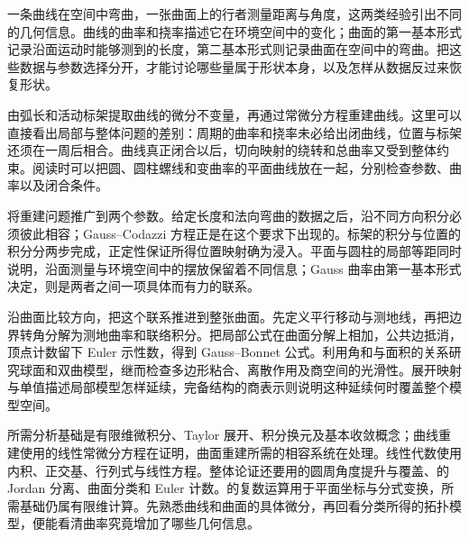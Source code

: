 
% 

\BookPartGuide

一条曲线在空间中弯曲，一张曲面上的行者测量距离与角度，这两类经验引出不同的几何信息。曲线的曲率和挠率描述它在环境空间中的变化；曲面的第一基本形式记录沿面运动时能够测到的长度，第二基本形式则记录曲面在空间中的弯曲。把这些数据与参数选择分开，才能讨论哪些量属于形状本身，以及怎样从数据反过来恢复形状。

\ProseParagraphBreak

由弧长和活动标架提取曲线的微分不变量，再通过常微分方程重建曲线。这里可以直接看出局部与整体问题的差别：周期的曲率和挠率未必给出闭曲线，位置与标架还须在一周后相合。曲线真正闭合以后，切向映射的绕转和总曲率又受到整体约束。阅读时可以把圆、圆柱螺线和变曲率的平面曲线放在一起，分别检查参数、曲率以及闭合条件。

\ProseParagraphBreak

将重建问题推广到两个参数。给定长度和法向弯曲的数据之后，沿不同方向积分必须彼此相容；Gauss--Codazzi 方程正是在这个要求下出现的。标架的积分与位置的积分分两步完成，正定性保证所得位置映射确为浸入。平面与圆柱的局部等距同时说明，沿面测量与环境空间中的摆放保留着不同信息；Gauss 曲率由第一基本形式决定，则是两者之间一项具体而有力的联系。

\ProseParagraphBreak

沿曲面比较方向，把这个联系推进到整张曲面。先定义平行移动与测地线，再把边界转角分解为测地曲率和联络积分。把局部公式在曲面分解上相加，公共边抵消，顶点计数留下 Euler 示性数，得到 Gauss--Bonnet 公式。利用角和与面积的关系研究球面和双曲模型，继而检查多边形粘合、离散作用及商空间的光滑性。展开映射与单值描述局部模型怎样延续，完备结构的商表示则说明这种延续何时覆盖整个模型空间。

\ProseParagraphBreak

所需分析基础是有限维微积分、Taylor 展开、积分换元及基本收敛概念；曲线重建使用的线性常微分方程在证明，曲面重建所需的相容系统在处理。线性代数使用内积、正交基、行列式与线性方程。整体论证还要用的圆周角度提升与覆盖、的 Jordan 分离、曲面分类和 Euler 计数。的复数运算用于平面坐标与分式变换，所需基础仍属有限维计算。先熟悉曲线和曲面的具体微分，再回看分类所得的拓扑模型，便能看清曲率究竟增加了哪些几何信息。





